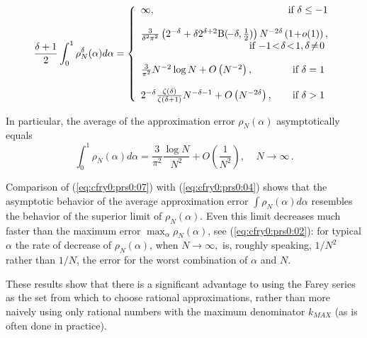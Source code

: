\begin{equation}
\label{eq:cfry0:prs0:06}
{
\frac{\delta+1}{2}
}
\int_0^1 \rho_N^{\delta} (\alpha) d \alpha =
\left\{\begin{array}{l}
    \infty{}, \hfill\mbox{if $ \delta \leq -1 $}\\
    \\
   \frac{3}{\delta^2 \pi^2 } \left(2^{-\delta} +
   \delta 2^{\delta+2} {\rm B}(\!-\delta,\frac{1}{2}) \right)
   N^{-2\delta}\left(1\! +\! o(1)\right), \\
   \hfill\mbox{if $-1\!<\!\delta\!<\!1, \delta\! \neq\! 0$ }\\
   \\
\frac{3}{\pi^2} N^{-2} \log N +
O\left( N^{-2} \right),
\hfill\mbox{if $\delta =1 $ }\\
\\
2^{-\delta}
\frac{\zeta(\delta)}{ \zeta(\delta+1)}
N^{-\delta-1}+
O\left( N^{-2\delta} \right),
                 \hfill  \mbox{if $\delta >1$ }
                  \end{array}
             \right.
\end{equation}

In particular, the average of the approximation error $\rho_N
(\alpha)$ asymptotically equals
\begin{equation}
\label{eq:cfry0:prs0:07}
\int_{0}^1 \rho_N(\alpha) d\alpha = \frac{3}{\pi^2} \frac{\log N}{N^2} +
O\left(\frac{1}{N^2}\right),
\;\;\;\; N\rightarrow \infty \,.
\end{equation}

Comparison of (\ref{eq:cfry0:prs0:07})
with (\ref{eq:cfry0:prs0:04}) shows that the
asymptotic behavior of the average approximation error $\int
\rho_N(\alpha) d\alpha$
resembles the behavior of the superior limit of $\rho_N(\alpha)$.
Even this limit
decreases much faster than the maximum error $\max_{\alpha }
\rho_N(\alpha)$, see
(\ref{eq:cfry0:prs0:02}): for typical $\alpha$ the rate of decrease of
$\rho_N(\alpha)$, when $ N\rightarrow \infty ,$
is, roughly speaking,  $1/N^2$ rather than $1/N$, the error for the
worst combination of $\alpha$ and $N$.

These results show that there is a significant advantage to using the Farey series
as the set from which to choose rational approximations, rather than
more naively using only rational numbers with the maximum
denominator $k_{MAX}$ (as is often done in practice).


